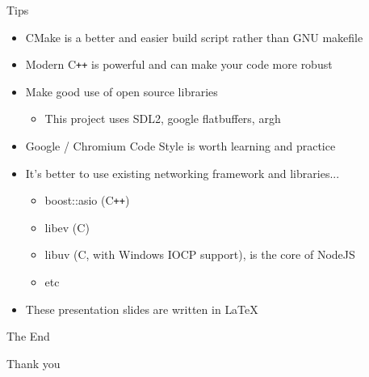 \documentclass{beamer}
\newcommand{\cpp}{C\texttt{++}}
\begin{document}
\begin{frame}{Tips}
  \begin{itemize}
  \item
    \alert{CMake} is a better and easier build script rather than GNU makefile
  \item
    \alert{Modern \cpp} is powerful and can make your code more robust
  \item
    Make good use of \alert{open source libraries}
    \begin{itemize}
      \item This project uses SDL2, google flatbuffers, argh
    \end{itemize}
  \item
    Google / Chromium Code Style is worth learning and practice
  \end{itemize}

  \begin{itemize}
  \item
    It's better to use existing networking framework and libraries...
    \begin{itemize}
    \item
      boost::asio (\cpp)
    \item
      libev (C)
    \item
      libuv (C, with Windows IOCP support), is the core of NodeJS
    \item
      etc
  \end{itemize}
  \item
    These presentation slides are written in \alert{\LaTeX}
\end{itemize}
\end{frame}


\begin{frame}
\Huge{\centerline{The End}}
\Huge{\centerline{ }}
\large{\centerline{Thank you}}
\end{frame}
\end{document}
